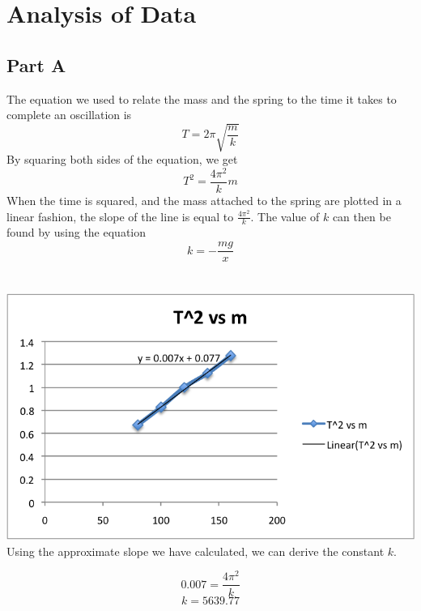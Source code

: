 \documentclass[twocolumn]{article}
\begin{document}



\section{Analysis of Data}\label{sec:analysis_of_data}

\subsection{Part A}\label{sub:part_a}
The equation we used to relate the mass and the spring to the time it takes to complete an oscillation is
\begin{equation}
	T = 2 \pi \sqrt{\frac{m}{k}}
\end{equation}
By squaring both sides of the equation, we get
\begin{equation}
	T^2 = \frac{4 \pi^2}{k} m
\end{equation}
When the time is squared, and the mass attached to the spring are plotted in a linear fashion, the slope of the line is equal to $\frac{4 \pi^2}{k}$. The value of $k$ can then be found by using the equation
\begin{equation}
	k = -\frac{mg}{x}
\end{equation}
\\
\\
\includegraphics[scale=0.65]{t2vsm.png}
\\
Using the approximate slope we have calculated, we can derive the constant $k$.

\[
	0.007 = \frac{4 \pi^2}{k}
\]
\[
	k = 5639.77
\]
\end{document}
